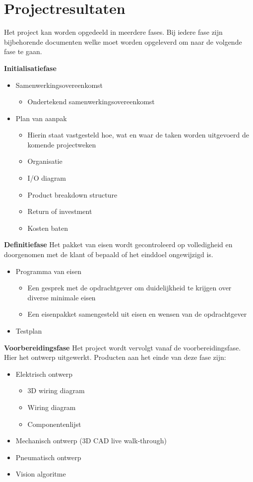 \section{Projectresultaten}
Het project kan worden opgedeeld in meerdere fases. Bij iedere fase zijn bijbehorende documenten welke moet worden opgeleverd om naar de volgende fase te gaan. 
\vspace{5mm}

\textbf{Initialisatiefase}


\begin{itemize}
	\item Samenwerkingsovereenkomst
	\begin{itemize}
		\item Ondertekend samenwerkingsovereenkomst
	\end{itemize}
	\item Plan van aanpak
	\begin{itemize}
		\item Hierin staat vastgesteld hoe, wat en waar de taken worden uitgevoerd de komende projectweken
		\item Organisatie
		\item I/O diagram
		\item Product breakdown structure
		\item Return of investment
		\item Kosten baten
	\end{itemize}
\end{itemize}


\textbf{Definitiefase}
Het pakket van eisen wordt gecontroleerd op volledigheid en doorgenomen met de klant of bepaald of het einddoel ongewijzigd is. 

\begin{itemize}
	\item Programma van eisen
	\begin{itemize}
		\item Een gesprek met de opdrachtgever om duidelijkheid te krijgen over diverse minimale eisen
		\item Een eisenpakket samengesteld uit eisen en wensen van de opdrachtgever
	\end{itemize}
	\item Testplan
\end{itemize}

\textbf{Voorbereidingsfase}
Het project wordt vervolgt vanaf de voorbereidingsfase. Hier het ontwerp uitgewerkt. Producten aan het einde van deze fase zijn:
\begin{itemize}
	\item Elektrisch ontwerp
	\begin{itemize}
		\item 3D wiring diagram
		\item Wiring diagram
		\item Componentenlijst
	\end{itemize}
	\item Mechanisch ontwerp (3D CAD live walk-through)
	\item Pneumatisch ontwerp
	\item Vision algoritme
\end{itemize}

